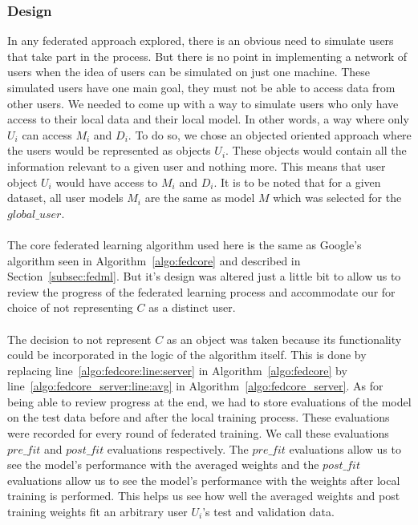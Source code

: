 \documentclass[12pt]{article}
\begin{document}
\subsubsection{Design}
In any federated approach explored, there is an obvious need to simulate users that take part in the process. But there is no point in  implementing a network of users when the idea of users can be simulated on just one machine. These simulated users have one main goal, they must not be able to access data from other users. We needed to come up with a way to simulate users who only have access to their local data and their local model. In other words, a way where only $U_i$ can access $M_i$ and $D_i$. To do so, we chose an objected oriented approach where the users would be represented as objects $U_i$. These objects would contain all the information relevant to a given user and nothing more. This means that user object $U_i$ would have access to $M_i$ and $D_i$. It is to be noted that for a given dataset, all user models $M_i$ are the same as model $M$ which was selected for the $global\_user$. 
\\\\
The core federated learning algorithm used here is the same as Google's algorithm seen in Algorithm~\ref{algo:fedcore} and described in Section~\ref{subsec:fedml}. But it's design was altered just a little bit to allow us to review the progress of the federated learning process and accommodate our for choice of not representing $C$ as a distinct user. 
\\\\
The decision to not represent $C$ as an object was taken because its functionality could be incorporated in the logic of the algorithm itself. This is done by replacing line~\ref{algo:fedcore:line:server} in Algorithm~\ref{algo:fedcore} by line~\ref{algo:fedcore_server:line:avg} in Algorithm~\ref{algo:fedcore_server}. As for being able to review progress at the end, we had to store evaluations of the model on the test data before and after the local training process. These evaluations were recorded for every round of federated training. We call these evaluations $pre\_fit$ and $post\_fit$ evaluations respectively. The $pre\_fit$ evaluations allow us to see the model's performance with the averaged weights and the $post\_fit$ evaluations allow us to see the model's performance with the weights after local training is performed. This helps us see how well the averaged weights and post training weights fit an arbitrary user $U_i$'s test and validation data. 
\\\\
\end{document}
